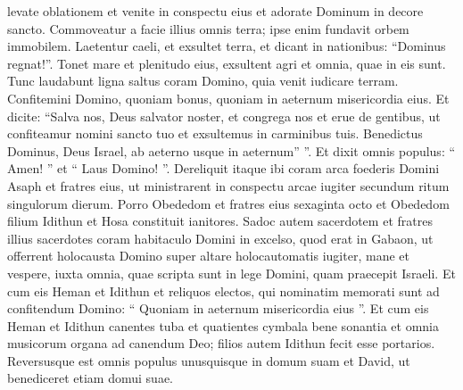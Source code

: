 \begin{biblechapter}
\begin{biblechapter}
\begin{biblechapter}
\begin{biblechapter}
\begin{biblechapter}
\begin{biblechapter}
\begin{biblechapter}
\begin{biblechapter}
\begin{biblechapter}
\begin{biblechapter}
\begin{biblechapter}
\begin{biblechapter}
\begin{biblechapter}
\begin{biblechapter}
\begin{biblechapter}
\begin{biblechapter}
 levate oblationem et venite in conspectu eius
 et adorate Dominum in decore sancto.
 \verse Commoveatur a facie illius omnis terra;
 ipse enim fundavit orbem immobilem.
 \verse Laetentur caeli, et exsultet terra,
 et dicant in nationibus: “Dominus regnat!”.
 \verse Tonet mare et plenitudo eius,
 exsultent agri et omnia, quae in eis sunt.
 \verse Tunc laudabunt ligna saltus coram Domino,
 quia venit iudicare terram.
 \verse Confitemini Domino, quoniam bonus,
 quoniam in aeternum misericordia eius.
 \verse Et dicite: “Salva nos, Deus salvator noster,
 et congrega nos et erue de gentibus, ut confiteamur nomini sancto tuo
 et exsultemus in carminibus tuis.
 \verse Benedictus Dominus, Deus Israel,
 ab aeterno usque in aeternum” ”.
 Et dixit omnis populus: “ Amen! ” et “ Laus Domino! ”.
 \verse Dereliquit itaque ibi coram arca foederis Domini Asaph et fratres eius, ut ministrarent in conspectu arcae iugiter secundum ritum singulorum dierum. \verse Porro Obededom et fratres eius sexaginta octo et Obededom filium Idithun et Hosa constituit ianitores. 
\verse Sadoc autem sacerdotem et fratres illius sacerdotes coram habitaculo Domini in excelso, quod erat in Gabaon, 
\verse ut offerrent holocausta Domino super altare holocautomatis iugiter, mane et vespere, iuxta omnia, quae scripta sunt in lege Domini, quam praecepit Israeli. 
\verse Et cum eis Heman et Idithun et reliquos electos, qui nominatim memorati sunt ad confitendum Domino: “ Quoniam in aeternum misericordia eius ”. 
\verse Et cum eis Heman et Idithun canentes tuba et quatientes cymbala bene sonantia et omnia musicorum organa ad canendum Deo; filios autem Idithun fecit esse portarios.
 \verse Reversusque est omnis populus unusquisque in domum suam et David, ut benediceret etiam domui suae.
 

\end{biblechapter}
\end{biblechapter}
\end{biblechapter}
\end{biblechapter}
\end{biblechapter}
\end{biblechapter}
\end{biblechapter}
\end{biblechapter}
\end{biblechapter}
\end{biblechapter}
\end{biblechapter}
\end{biblechapter}
\end{biblechapter}
\end{biblechapter}
\end{biblechapter}
\end{biblechapter}
